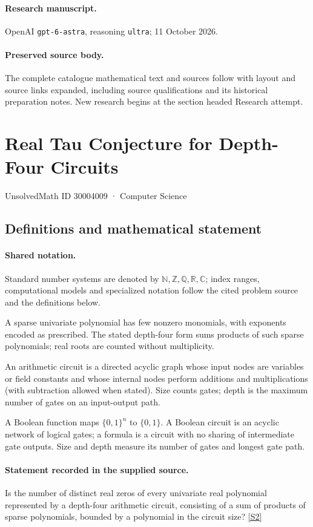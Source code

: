 \documentclass[11pt]{article}
\begin{document}
\paragraph{Research manuscript.} OpenAI \texttt{gpt-6-astra}, reasoning \texttt{ultra}; 11 October 2026.
\paragraph{Preserved source body.} The complete catalogue mathematical text and sources follow with layout and source links expanded, including source qualifications and its historical preparation notes. New research begins at the section headed Research attempt.

\section{Real Tau Conjecture for Depth-Four Circuits}\label{30004009}
{\small UnsolvedMath ID 30004009 · Computer Science}
\subsection{Definitions and mathematical statement}

\paragraph{Shared notation.}Standard number systems are denoted by $\mathbb N,\mathbb Z,\mathbb Q,\mathbb R,\mathbb C$; index ranges, computational models and specialized notation follow the cited problem source and the definitions below.


A sparse univariate polynomial has few nonzero monomials, with exponents encoded as prescribed. The stated depth-four form sums products of such sparse polynomials; real roots are counted without multiplicity.

An arithmetic circuit is a directed acyclic graph whose input nodes are variables or field constants and whose internal nodes perform additions and multiplications (with subtraction allowed when stated). Size counts gates; depth is the maximum number of gates on an input-output path.

A Boolean function maps $\{0,1\}^n$ to $\{0,1\}$. A Boolean circuit is an acyclic network of logical gates; a formula is a circuit with no sharing of intermediate gate outputs. Size and depth measure its number of gates and longest gate path.
\paragraph{Statement recorded in the supplied source.}
Is the number of distinct real zeros of every univariate real polynomial represented by a depth-four arithmetic circuit, consisting of a sum of products of sparse polynomials, bounded by a polynomial in the circuit size? \href{https://doi.org/10.4171/owr/2018/51}{[S2]}
\end{document}
